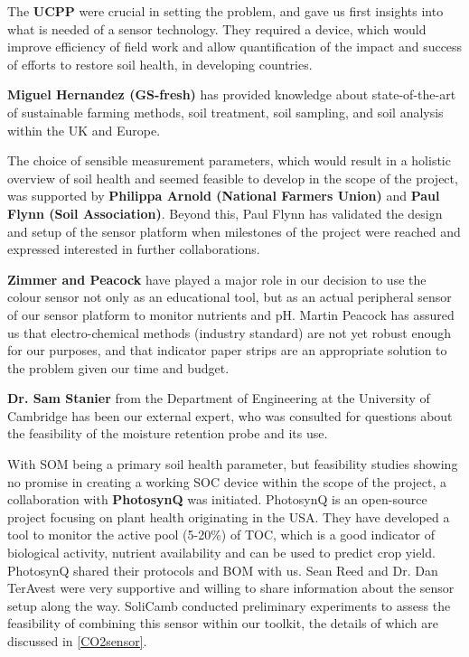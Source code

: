     The \textbf{\gls{UCPP}} were crucial in setting the problem, and gave us first insights into what is needed of a sensor technology. They required a device, which would improve efficiency of field work and allow quantification of the impact and success of efforts to restore soil health, in developing countries. 
    
   \textbf{Miguel Hernandez (GS-fresh)} has provided knowledge about state-of-the-art of sustainable farming methods, soil treatment, soil sampling, and soil analysis within the UK and Europe.
    
    The choice of sensible measurement parameters, which would result in a holistic overview of soil health and seemed feasible to develop in the scope of the project, was supported by \textbf{Philippa Arnold (National Farmers Union)} and \textbf{Paul Flynn (Soil Association)}. Beyond this, Paul Flynn has validated the design and setup of the sensor platform when milestones of the project were reached and expressed interested in further collaborations. 
    
    \textbf{Zimmer and Peacock} have played a major role in our decision to use the colour sensor not only as an educational tool, but as an actual peripheral sensor of our sensor platform to monitor nutrients and pH. Martin Peacock has assured us that electro-chemical methods (industry standard) are not yet robust enough for our purposes, and that indicator paper strips are an appropriate solution to the problem given our time and budget.
    
    \textbf{Dr. Sam Stanier} from the Department of Engineering at the University of Cambridge has been our external expert, who was consulted for questions about the feasibility of the moisture retention probe and its use.
    
    With \gls{SOM} being a primary soil health parameter, but feasibility studies showing no promise in creating a working \gls{SOC} device within the scope of the project, a collaboration with \textbf{PhotosynQ} was initiated. PhotosynQ is an open-source project focusing on plant health originating in the USA. They have developed a tool to monitor the active pool (5-20\%) of \gls{TOC}, which is a good indicator of biological activity, nutrient availability and can be used to predict crop yield. 
    PhotosynQ shared their protocols and \gls{BOM} with us. Sean Reed and Dr. Dan TerAvest were very supportive and willing to share information about the sensor setup along the way. SoliCamb conducted preliminary experiments to assess the feasibility of combining this sensor within our toolkit, the details of which are discussed in \cref{CO2sensor}.
    
